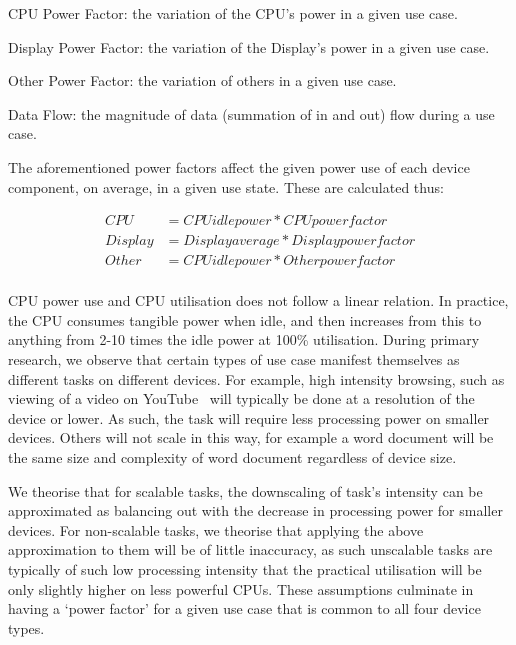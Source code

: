\documentclass[conference]{IEEEtran}
\begin{document}
\begin{compactitem}
\item CPU Power Factor: the variation of the CPU’s power in a given use case.
\item Display Power Factor: the variation of the Display’s power in a given use case.
\item Other Power Factor: the variation of others in a given use case.
\item Data Flow: the magnitude of data (summation of in and out) flow during a use case.
\end{compactitem}

The aforementioned power factors affect the given power use of each
device component, on average, in a given use state. These are
calculated thus:

\begin{align*}
CPU &= CPU idle power * CPU power factor\\
Display &= Display average * Display power factor\\
Other &= CPU idle power * Other power factor\\
\end{align*}

CPU power use and CPU utilisation does not follow a linear
relation. In practice, the CPU consumes tangible power when idle, and
then increases from this to anything from 2-10 times the idle power at
100\% utilisation. During primary research, we observe that certain
types of use case manifest themselves as different tasks on different
devices. For example, high intensity browsing, such as viewing of a
video on YouTube~\cite{schien-et-al:2013} will typically be done at a
resolution of the device or lower. As such, the task will require less
processing power on smaller devices. Others will not scale in this
way, for example a word document will be the same size and complexity
of word document regardless of device size.

We theorise that for scalable tasks, the downscaling of task's
intensity can be approximated as balancing out with the decrease in
processing power for smaller devices. For non-scalable tasks, we
theorise that applying the above approximation to them will be of
little inaccuracy, as such unscalable tasks are typically of such low
processing intensity that the practical utilisation will be only
slightly higher on less powerful CPUs.  These assumptions culminate in
having a `power factor' for a given use case that is common to all
four device types.
\end{document}
